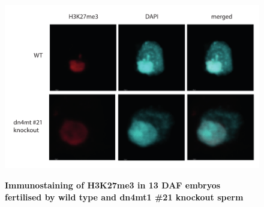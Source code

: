 \begin{figure}[htbp!] 
\centering    
    \includegraphics[width=1\textwidth]{Chapter3/Figs/Supps/FigureS1_immunostaining.pdf}
\caption{\textbf{Immunostaining of H3K27me3 in 13 DAF embryos fertilised by wild type and dn4mt1 \#21 knockout sperm }}
\label{fig:immuno}
\captionsetup{font=small}
    \caption*{}
\end{figure}


